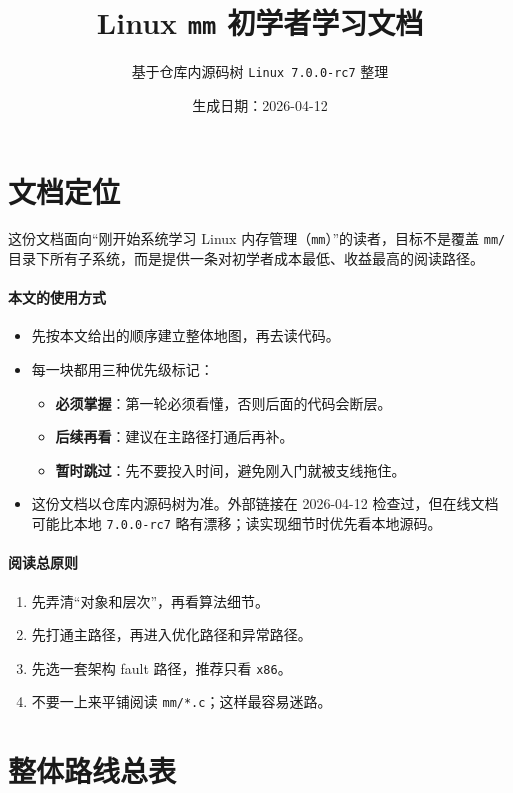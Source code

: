 \documentclass[UTF8,a4paper,11pt]{ctexart}
\title{\textbf{Linux \texttt{mm} 初学者学习文档}}
\author{基于仓库内源码树 \texttt{Linux 7.0.0-rc7} 整理}
\date{生成日期：2026-04-12}
\newcommand{\musttag}{\colorbox{mmMustBg}{\textbf{必须掌握}}}
\newcommand{\latertag}{\colorbox{mmLaterBg}{\textbf{后续再看}}}
\newcommand{\skiptag}{\colorbox{mmSkipBg}{\textbf{暂时跳过}}}
\begin{document}
\maketitle
\tableofcontents
\newpage

\section{文档定位}

这份文档面向“刚开始系统学习 Linux 内存管理（\texttt{mm}）”的读者，目标不是覆盖
\texttt{mm/} 目录下所有子系统，而是提供一条对初学者成本最低、收益最高的阅读路径。

\paragraph{本文的使用方式}
\begin{itemize}
  \item 先按本文给出的顺序建立整体地图，再去读代码。
  \item 每一块都用三种优先级标记：
  \begin{itemize}
    \item \musttag：第一轮必须看懂，否则后面的代码会断层。
    \item \latertag：建议在主路径打通后再补。
    \item \skiptag：先不要投入时间，避免刚入门就被支线拖住。
  \end{itemize}
  \item 这份文档以仓库内源码树为准。外部链接在 2026-04-12 检查过，但在线文档可能比本地
  \texttt{7.0.0-rc7} 略有漂移；读实现细节时优先看本地源码。
\end{itemize}

\paragraph{阅读总原则}
\begin{enumerate}
  \item 先弄清“对象和层次”，再看算法细节。
  \item 先打通主路径，再进入优化路径和异常路径。
  \item 先选一套架构 fault 路径，推荐只看 \texttt{x86}。
  \item 不要一上来平铺阅读 \texttt{mm/*.c}；这样最容易迷路。
\end{enumerate}

\section{整体路线总表}
\end{document}
